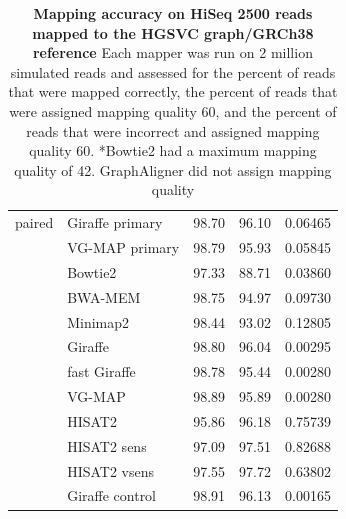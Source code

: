 \documentclass[11pt]{ucscthesis}
\begin{document}
\begin{table}[H]
\begin{tabular}{|l|l|r|r|r|}
        \hline
        paired  & Giraffe primary	& 98.70     & 96.10     & 0.06465 \\
                & VG-MAP primary	& 98.79     & 95.93     & 0.05845 \\
                & Bowtie2       	& 97.33     & 88.71     & 0.03860 \\
                & BWA-MEM       	& 98.75     & 94.97     & 0.09730 \\
                & Minimap2      	& 98.44     & 93.02     & 0.12805 \\
                & Giraffe       	& 98.80     & 96.04     & 0.00295 \\
                & fast Giraffe  	& 98.78     & 95.44     & 0.00280 \\
                & VG-MAP        	& 98.89     & 95.89     & 0.00280 \\
                & HISAT2        	& 95.86     & 96.18     & 0.75739 \\
                & HISAT2 sens   	& 97.09     & 97.51     & 0.82688 \\
                & HISAT2 vsens	    & 97.55     & 97.72     & 0.63802 \\
                & Giraffe control	& 98.91     & 96.13     & 0.00165 \\


        \hline
        
    \end{tabular}
    \caption[Mapping accuracy on HiSeq 2500 reads mapped to the HGSVC graph/GRCh38 reference]{\textbf{Mapping accuracy on HiSeq 2500 reads mapped to the HGSVC graph/GRCh38 reference} Each mapper was run on 2 million simulated reads and assessed for the percent of reads that were mapped correctly, the percent of reads that were assigned mapping quality 60, and the percent of reads that were incorrect and assigned mapping quality 60. *Bowtie2 had a maximum mapping quality of 42. GraphAligner did not assign mapping quality}
    \label{tab:mapping_accuracy_hgsvc_hiseq2500}
\end{table}
\end{document}
